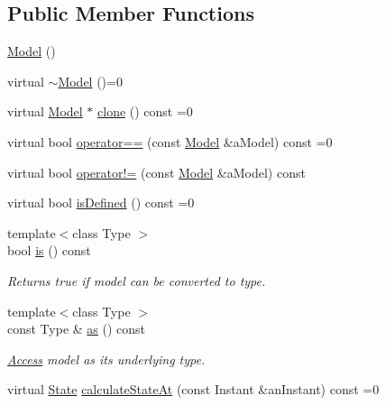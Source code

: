 \subsection*{Public Member Functions}
\begin{DoxyCompactItemize}
\item 
\hyperlink{classostk_1_1astro_1_1flight_1_1profile_1_1_model_a6301933ec5ccdd9dab16fa8ecbf73869}{Model} ()
\item 
virtual \hyperlink{classostk_1_1astro_1_1flight_1_1profile_1_1_model_a4870ff5251fa9f4f27f961700ce49863}{$\sim$\+Model} ()=0
\item 
virtual \hyperlink{classostk_1_1astro_1_1flight_1_1profile_1_1_model}{Model} $\ast$ \hyperlink{classostk_1_1astro_1_1flight_1_1profile_1_1_model_aabf68c114849fa16a570b694579da40f}{clone} () const =0
\item 
virtual bool \hyperlink{classostk_1_1astro_1_1flight_1_1profile_1_1_model_a87f7ca747d79619e4b4bc04aa6a9252a}{operator==} (const \hyperlink{classostk_1_1astro_1_1flight_1_1profile_1_1_model}{Model} \&a\+Model) const =0
\item 
virtual bool \hyperlink{classostk_1_1astro_1_1flight_1_1profile_1_1_model_a66eab26e18de60c179529ba5924b168f}{operator!=} (const \hyperlink{classostk_1_1astro_1_1flight_1_1profile_1_1_model}{Model} \&a\+Model) const
\item 
virtual bool \hyperlink{classostk_1_1astro_1_1flight_1_1profile_1_1_model_a0af64ad25ed8d8b2510a70bfe5bcb971}{is\+Defined} () const =0
\item 
{\footnotesize template$<$class Type $>$ }\\bool \hyperlink{classostk_1_1astro_1_1flight_1_1profile_1_1_model_a73363668308f0293014d6a77063cc809}{is} () const
\begin{DoxyCompactList}\small\item\em Returns true if model can be converted to type. \end{DoxyCompactList}\item 
{\footnotesize template$<$class Type $>$ }\\const Type \& \hyperlink{classostk_1_1astro_1_1flight_1_1profile_1_1_model_a7842761a8f6c0895c0b6048e9d3a5b7f}{as} () const
\begin{DoxyCompactList}\small\item\em \hyperlink{classostk_1_1astro_1_1_access}{Access} model as its underlying type. \end{DoxyCompactList}\item 
virtual \hyperlink{classostk_1_1astro_1_1flight_1_1profile_1_1_state}{State} \hyperlink{classostk_1_1astro_1_1flight_1_1profile_1_1_model_a1b205fa29b50fcfc06c99234a8579eb8}{calculate\+State\+At} (const Instant \&an\+Instant) const =0

\end{DoxyCompactItemize}
